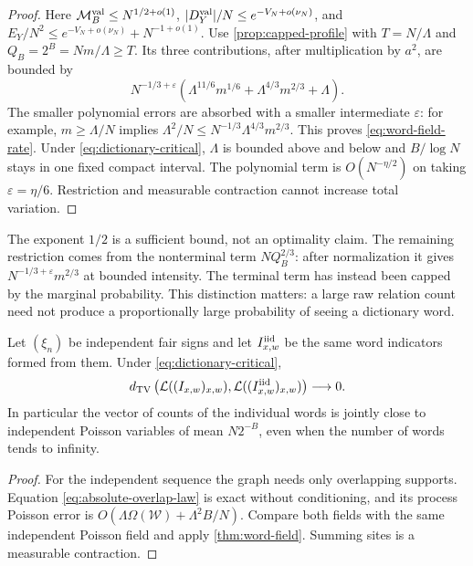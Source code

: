 \begin{proof}
Here $\mathcal M_B^{\rm val}\le N^{1/2+o(1)}$,
$|D_Y^{\rm val}|/N\le e^{-V_N+o(\nu_N)}$, and
$E_Y/N^2\le e^{-V_N+o(\nu_N)}+N^{-1+o(1)}$.
Use \cref{prop:capped-profile} with $T=N/\Lambda$ and
$Q_B=2^B=Nm/\Lambda\ge T$. Its three contributions, after multiplication
by $a^2$, are bounded by
\[
 N^{-1/3+\varepsilon}
 \left(\Lambda^{11/6}m^{1/6}
                +\Lambda^{4/3}m^{2/3}+\Lambda\right).
\]
The smaller polynomial errors are absorbed with a smaller intermediate
$\varepsilon$: for example, $m\ge\Lambda/N$ implies
$\Lambda^2/N\le
N^{-1/3}\Lambda^{4/3}m^{2/3}$. This proves
\eqref{eq:word-field-rate}.
Under \eqref{eq:dictionary-critical}, $\Lambda$ is bounded above and
below and $B/\log N$ stays in one fixed compact interval. The polynomial
term is $O(N^{-\eta/2})$ on taking $\varepsilon=\eta/6$.
Restriction and measurable contraction cannot increase total variation.
\end{proof}

The exponent $1/2$ is a sufficient bound, not an optimality claim. The
remaining restriction comes from the nonterminal term $NQ_B^{2/3}$:
after normalization it gives $N^{-1/3+\varepsilon}m^{2/3}$ at bounded
intensity. The terminal term has instead been capped by the marginal
probability. This distinction matters: a large raw relation count need
not produce a proportionally large probability of seeing a dictionary
word.

\begin{corollary}\label{cor:iid-word-replacement}
Let $(\xi_n)$ be independent fair signs and let $I^{\rm iid}_{x,w}$ be the
same word indicators formed from them. Under
\eqref{eq:dictionary-critical},
\[
 d_{\mathrm{TV}}\left(\mathcal L((I_{x,w})_{x,w}),
                     \mathcal L((I^{\rm iid}_{x,w})_{x,w})\right)\longrightarrow0.
\]
In particular the vector of counts of the individual words is jointly
close to independent Poisson variables of mean $N2^{-B}$, even when the
number of words tends to infinity.
\end{corollary}
\begin{proof}
For the independent sequence the graph needs only overlapping supports.
Equation \eqref{eq:absolute-overlap-law} is exact without conditioning,
and its process Poisson error is
$O(\Lambda\Omega(\mathcal W)+\Lambda^2B/N)$.
Compare both fields with the same independent Poisson field and apply
\cref{thm:word-field}. Summing sites is a measurable contraction.
\end{proof}

